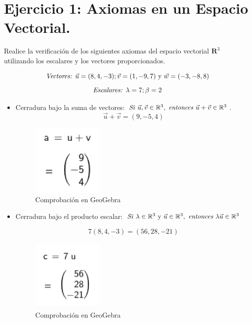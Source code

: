
\section{\large Ejercicio 1: Axiomas en un Espacio Vectorial.}
Realice la verificación de los siguientes axiomas del espacio vectorial $\mathbf{R}^3$ utilizando los escalares y los vectores proporcionados.

\[
    \text{\textit{Vectores: }}\vec{u}=(8,4,-3);\vec{v}=(1,-9,7)\text{ y }\vec{w}=(-3,-8,8)
\]
\[
    \text{\textit{Escalares: }}\lambda=7;\beta=2
\]


\begin{itemize}
    \item Cerradura bajo la suma de vectores: \(\text{\textit{Si} }\vec{u},\vec{v}\in\mathbb{R}^3,\text{ \textit{entonces} }\vec{u}+\vec{v}\in\mathbb{R}^3\).
    \[
        \vec{u}+\vec{v}=(9,-5,4)
    \]
    \begin{figure}[ht!]
        \centering
        \includegraphics[width=100pt,height=100pt]{img/imagen1.png}
        \caption{Comprobación en GeoGebra}
    \end{figure}

    \item Cerradura bajo el producto escalar: \(\text{\textit{Si} }\lambda\in\mathbb{R}^3\text{ y }\vec{u}\in\mathbb{R}^3,\text{ \textit{entonces} }\lambda\vec{u}\in\mathbb{R}^3\)
    
    \[
        7(8,4,-3)=(56,28,-21)
    \]
    \begin{figure}[ht!]
        \centering
        \includegraphics[width=100pt,height=100pt]{img/imagen2.png}
        \caption{Comprobación en GeoGebra}
    \end{figure}


\end{itemize}
